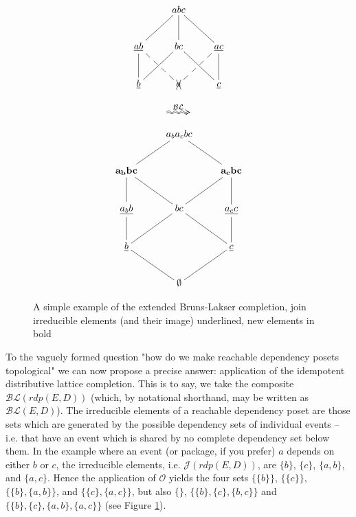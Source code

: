 \documentclass[hoptionsi,review,format=acmsmall]{acmart}
\theoremstyle{definition}
\newcommand{\Oc}{\mathcal{O}}
\newcommand{\Jc}{\mathcal{J}}
\newcommand{\BLc}{\mathcal{BL}}
\begin{document}
\begin{figure}
\begin{minipage}[c]{0.3\textwidth}
\begin{equation*}
    \xymatrix{& abc \ar@{-}[dl] \ar@{-}[d] \ar@{-}[dr] & \\
      \underline{ab} \ar@{-}[d] \ar@{--}[dr] & bc \ar@{-}[dl] \ar@{-}[dr] &
        \underline{ac} \ar@{-}[d] \ar@{--}[dl] \\
        \underline{b} & \xcancel{a}  & \underline{c} }         
\end{equation*}
\end{minipage}
\begin{minipage}[c]{0.08\textwidth}
  \begin{equation*}
    \xymatrix{\ar@2{~>}[r]^{\BLc} &}
  \end{equation*}
\end{minipage}
\begin{minipage}[c]{0.3\textwidth}
\begin{equation*}
    \xymatrix{& a_ba_cbc \ar@{-}[dl]  \ar@{-}[dr] & \\
      \mathbf{a_bbc} \ar@{-}[d] \ar@{-}[dr] & &
        \mathbf{a_cbc} \ar@{-}[d] \ar@{-}[dl]\\
        \underline{a_bb} \ar@{-}[d] & bc \ar@{-}[dl] \ar@{-}[dr] &
          \underline{a_cc} \ar@{-}[d] \\
         \underline{b} \ar@{-}[dr] & & \underline{c} \ar@{-}[dl] \\
      & \mathbf{\emptyset} }
\end{equation*}
\end{minipage}
\caption{A simple example of the extended Bruns-Lakser completion, join irreducible elements (and their image) underlined, new elements in bold}
\label{Fig1}
\end{figure}



To the vaguely formed question "how do we make reachable dependency posets topological" we can now propose a precise answer: application of the idempotent distributive lattice completion. This is to say, we take the composite \(\BLc(rdp(E,D))\) (which, by notational shorthand, may be written as \(\BLc(E,D)\)). The irreducible elements of a reachable dependency poset are those sets which are generated by the possible dependency sets of individual events -- i.e. that have an event which is shared by no complete dependency set below them. In the example where an event (or package, if you prefer) \(a\) depends on either \(b\) or \(c\), the irreducible elements, i.e. \(\Jc(rdp(E,D))\), are \(\{b\}\), \(\{c\}\), \(\{a,b\}\), and \(\{a,c\}\). Hence the application of \(\Oc\) yields the four sets \(\{\{b\}\}\), \(\{\{c\}\}\), \(\{\{b\},\{a,b\}\}\), and \(\{\{c\},\{a,c\}\}\), but also \(\{\}\), \(\{\{b\},\{c\},\{b,c\}\}\) and \(\{\{b\},\{c\},\{a,b\},\{a,c\}\}\) (see Figure \ref{Fig1}).
\end{document}
